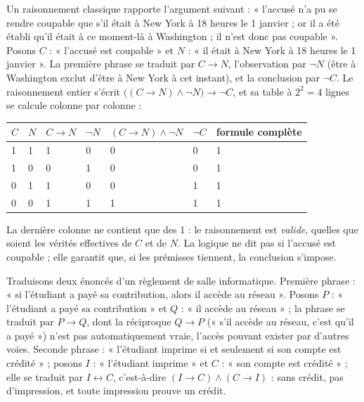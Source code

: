 \begin{exemple}
Un raisonnement classique rapporte l'argument suivant : « l'accusé n'a pu se rendre coupable que s'il était à New York à 18 heures le 1\ier{} janvier ; or il a été établi qu'il était à ce moment-là à Washington ; il n'est donc pas coupable ». Posons $C$ : « l'accusé est coupable » et $N$ : « il était à New York à 18 heures le 1\ier{} janvier ». La première phrase se traduit par $C \rightarrow N$, l'observation par $\lnot N$ (être à Washington exclut d'être à New York à cet instant), et la conclusion par $\lnot C$. Le raisonnement entier s'écrit $\bigl((C \rightarrow N) \land \lnot N\bigr) \rightarrow \lnot C$, et sa table à $2^2 = 4$ lignes se calcule colonne par colonne :

\begin{center}
\begin{tabular}{C{0.8cm}C{0.8cm}C{1.7cm}C{1.1cm}C{2.9cm}C{1.0cm}C{3.2cm}}
\toprule
{}$C$ & $N$ & $C \rightarrow N$ & $\lnot N$ & $(C \rightarrow N) \land \lnot N$ & $\lnot C$ & formule complète\\
 & 1 & 1 & 0 & 0 & 0 & 1\\
1 & 0 & 0 & 1 & 0 & 0 & 1\\
0 & 1 & 1 & 0 & 0 & 1 & 1\\
0 & 0 & 1 & 1 & 1 & 1 & 1\\
\bottomrule
\end{tabular}
\label{ch2:tab:accuse}
\end{center}

La dernière colonne ne contient que des 1 : le raisonnement est \emph{valide}, quelles que soient les vérités effectives de $C$ et de $N$. La logique ne dit pas si l'accusé est coupable ; elle garantit que, si les prémisses tiennent, la conclusion s'impose.
\end{exemple}

\begin{exemple}
Traduisons deux énoncés d'un règlement de salle informatique. Première phrase : « si l'étudiant a payé sa contribution, alors il accède au réseau ». Posons $P$ : « l'étudiant a payé sa contribution » et $Q$ : « il accède au réseau » ; la phrase se traduit par $P \rightarrow Q$, dont la réciproque $Q \rightarrow P$ (« s'il accède au réseau, c'est qu'il a payé ») n'est pas automatiquement vraie, l'accès pouvant exister par d'autres voies. Seconde phrase : « l'étudiant imprime si et seulement si son compte est crédité » ; posons $I$ : « l'étudiant imprime » et $C$ : « son compte est crédité » ; elle se traduit par $I \leftrightarrow C$, c'est-à-dire $(I \rightarrow C) \land (C \rightarrow I)$ : sans crédit, pas d'impression, et toute impression prouve un crédit.
\end{exemple}

